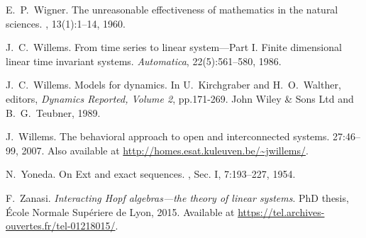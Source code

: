 \begin{thebibliography}{RSW00}
    E.\ P.\ Wigner.
    \newblock The unreasonable effectiveness of mathematics in the natural
    sciences.
    , 13(1):1--14,
    1960.

    J.\ C.\ Willems.
    \newblock From time series to linear system---Part I.
    Finite dimensional linear time invariant systems.
    \newblock \emph{Automatica}, 22(5):561--580, 1986. 

    J.\ C.\ Willems.
    \newblock Models for dynamics.
    \newblock In U.\ Kirchgraber and H.\ O.\ Walther, editors, \emph{Dynamics Reported,
    Volume 2}, pp.171-269.  John Wiley \& Sons
    Ltd and B.\ G.\ Teubner, 1989.

    J.\ Willems.
    \newblock The behavioral approach to open and interconnected
    systems.
     { 27}:46--99, 2007.
    \newblock Also available at
    \href{http://homes.esat.kuleuven.be/~jwillems/}  
    {http://homes.esat.kuleuven.be/\~{}jwillems/}.


    N.\ Yoneda. 
    \newblock On Ext and exact sequences.
    , Sec. I, 7:193--227, 1954.

     F.\ Zanasi. 
    \newblock \emph{Interacting Hopf algebras---the theory of linear
    systems}. 
    \newblock PhD thesis, \'Ecole Normale Sup\'eriere de Lyon, 2015. 
    \newblock Available
    at \href{https://tel.archives-ouvertes.fr/tel-01218015/}{https://tel.archives-ouvertes.fr/tel-01218015/}.

\end{thebibliography}


